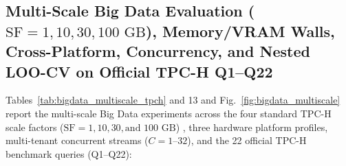 \documentclass[10pt,a4paper]{article}
\begin{document}
\begin{enumerate}[leftmargin=1.5em,itemsep=2pt]
\end{enumerate}

\subsection{Multi-Scale Big Data Evaluation ($\text{SF}=1, 10, 30, 100\text{ GB}$), Memory/VRAM Walls, Cross-Platform, Concurrency, and Nested LOO-CV on Official TPC-H Q1--Q22}
Tables~\ref{tab:bigdata_multiscale_tpch} and 13 and Fig.~\ref{fig:bigdata_multiscale} report the multi-scale Big Data experiments across the four standard TPC-H scale factors ($\text{SF}=1, 10, 30, \text{and } 100\text{ GB}$) \cite{tpc2022tpch,dreseler2020quantifying}, three hardware platform profiles, multi-tenant concurrent streams ($C=1\text{--}32$), and the 22 official TPC-H benchmark queries (Q1--Q22):
\begin{enumerate}[leftmargin=1.5em,itemsep=2pt]

\end{enumerate}
\end{document}
